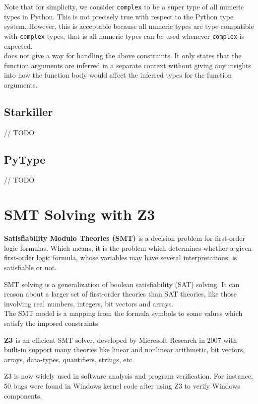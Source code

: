 Note that for simplicity, we consider \lstinline|complex| to be a super type of all numeric types in Python. This is not precisely true with respect to the Python type system. However, this is acceptable because all numeric types are type-compatible with \lstinline|complex| types, that is all numeric types can be used whenever \lstinline|complex| is expected.\\

\cite{porto} does not give a way for handling the above constraints. It only states that the function arguments are inferred in a separate context without giving any insights into how the function body would affect the inferred types for the function arguments.


\subsection{Starkiller}
// TODO

\subsection{PyType}
// TODO


\section{SMT Solving with Z3 \cite{z3}}
\textbf{Satisfiability Modulo Theories (SMT)} is a decision problem for first-order logic formulas. Which means, it is the problem which determines whether a given first-order logic formula, whose variables may have several interpretations, is satisfiable or not.

SMT solving is a generalization of boolean satisfiability (SAT) solving. It can reason about a larger set of first-order theories than SAT theories, like those involving real numbers, integers, bit vectors and arrays.\\

The SMT model is a mapping from the formula symbols to some values which satisfy the imposed constraints.

\textbf{Z3 \cite{z3}} is an efficient SMT solver, developed by Microsoft Research in 2007 with built-in support many theories like linear and nonlinear arithmetic, bit vectors, arrays, data-types, quantifiers, strings, etc.

Z3 is now widely used in software analysis and program verification. For instance, 50 bugs were found in Windows kernel code after using Z3 to verify Windows components. \cite{expz3}\\

